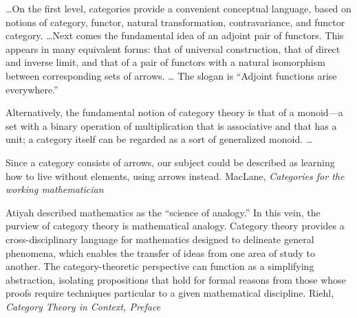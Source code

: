 \documentclass[11pt,openany]{book}
\begin{document}
\begin{boxquote}
\ldots On the first level, categories provide
a convenient conceptual language, based on notions of category, 
functor, natural transformation, contravariance, and
functor category.
\ldots Next comes the fundamental idea of an adjoint pair of functors.
This appears in many equivalent forms: that of universal construction,
that of direct and inverse limit, 
and that of a pair of functors with a natural isomorphism between
corresponding sets of arrows. \ldots
The slogan is ``Adjoint functions arise everywhere.''
\par
Alternatively, the fundamental notion of category theory is that
of a monoid---a set with a binary operation of multiplication
that is associative and that has a unit;
a category itself can be regarded as a sort of generalized monoid.
\ldots
\par
Since a category consists of arrows, our subject could be 
described as learning how to live without elements, using arrows
instead.
\tcblower
{MacLane, \emph{Categories for the working
mathematician}~\cite{Maclane:19968:CategoriesWorking}}
\end{boxquote}

\begin{boxquote}
Atiyah described mathematics as the
``science of analogy.'' In this vein, the purview
of category theory is mathematical analogy. 
Category theory provides a cross-disciplinary
language for mathematics designed to delineate general phenomena,
which enables the
transfer of ideas from one area of study to another. 
The category-theoretic perspective can
function as a simplifying abstraction, isolating propositions 
that hold for formal reasons
from those whose proofs require techniques particular 
to a given mathematical discipline.
\tcblower
{Riehl, 
\emph{Category Theory in Context, Preface
}~\cite{Riehl:2017:CatTheory}}
\end{boxquote}
\end{document}
